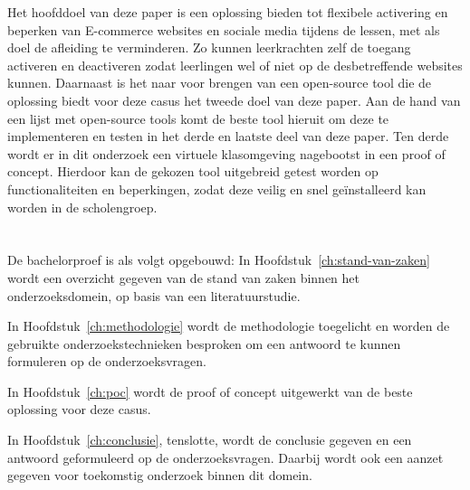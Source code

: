Het hoofddoel van deze paper is een oplossing bieden tot flexibele activering en beperken van E-commerce websites en sociale media tijdens de lessen, met als doel de afleiding te verminderen. Zo kunnen leerkrachten zelf de toegang activeren en deactiveren zodat leerlingen wel of niet op de desbetreffende websites kunnen. Daarnaast is het naar voor brengen van een open-source tool die de oplossing biedt voor deze casus het tweede doel van deze paper. Aan de hand van een lijst met open-source tools komt de beste tool hieruit om deze te implementeren en testen in het derde en laatste deel van deze paper. Ten derde wordt er in dit onderzoek een virtuele klasomgeving nagebootst in een proof of concept. Hierdoor kan de gekozen tool uitgebreid getest worden op functionaliteiten en beperkingen, zodat deze veilig en snel geïnstalleerd kan worden in de scholengroep.

\section{}%
\label{sec:opzet-bachelorproef}


De bachelorproef is als volgt opgebouwd:
In Hoofdstuk~\ref{ch:stand-van-zaken} wordt een overzicht gegeven van de stand van zaken binnen het onderzoeksdomein, op basis van een literatuurstudie.

In Hoofdstuk~\ref{ch:methodologie} wordt de methodologie toegelicht en worden de gebruikte onderzoekstechnieken besproken om een antwoord te kunnen formuleren op de onderzoeksvragen.

In Hoofdstuk~\ref{ch:poc} wordt de proof of concept uitgewerkt van de beste oplossing voor deze casus.

In Hoofdstuk~\ref{ch:conclusie}, tenslotte, wordt de conclusie gegeven en een antwoord geformuleerd op de onderzoeksvragen. Daarbij wordt ook een aanzet gegeven voor toekomstig onderzoek binnen dit domein.
